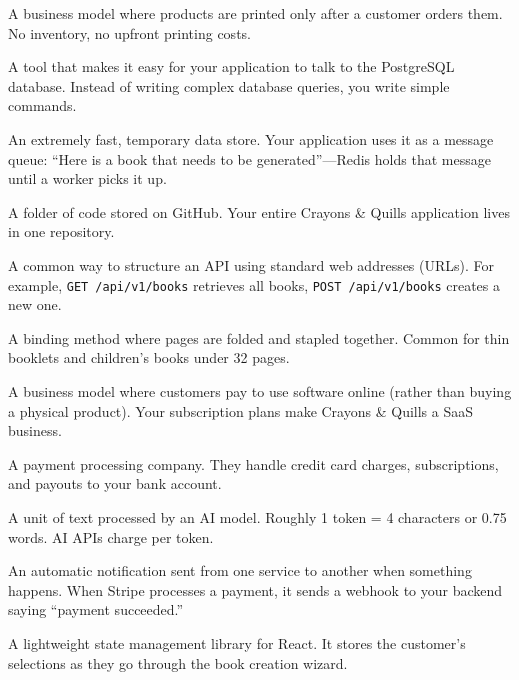 \documentclass[12pt, letterpaper, oneside]{book}
\begin{document}
\begin{description}[style=nextline, leftmargin=2em, itemsep=6pt]
\item[Print-on-Demand (POD)]
A business model where products are printed only after a customer orders them. No inventory, no upfront printing costs.

\item[Prisma]
A tool that makes it easy for your application to talk to the PostgreSQL database. Instead of writing complex database queries, you write simple commands.

\item[Redis]
An extremely fast, temporary data store. Your application uses it as a message queue: ``Here is a book that needs to be generated''---Redis holds that message until a worker picks it up.

\item[Repository (Repo)]
A folder of code stored on GitHub. Your entire Crayons \& Quills application lives in one repository.

\item[REST API]
A common way to structure an API using standard web addresses (URLs). For example, \texttt{GET /api/v1/books} retrieves all books, \texttt{POST /api/v1/books} creates a new one.

\item[Saddle-Stitch]
A binding method where pages are folded and stapled together. Common for thin booklets and children's books under 32 pages.

\item[SaaS (Software as a Service)]
A business model where customers pay to use software online (rather than buying a physical product). Your subscription plans make Crayons \& Quills a SaaS business.

\item[Stripe]
A payment processing company. They handle credit card charges, subscriptions, and payouts to your bank account.

\item[Token (AI)]
A unit of text processed by an AI model. Roughly 1 token = 4 characters or 0.75 words. AI APIs charge per token.

\item[Webhook]
An automatic notification sent from one service to another when something happens. When Stripe processes a payment, it sends a webhook to your backend saying ``payment succeeded.''

\item[Zustand]
A lightweight state management library for React. It stores the customer's selections as they go through the book creation wizard.

\end{description}
\end{document}
